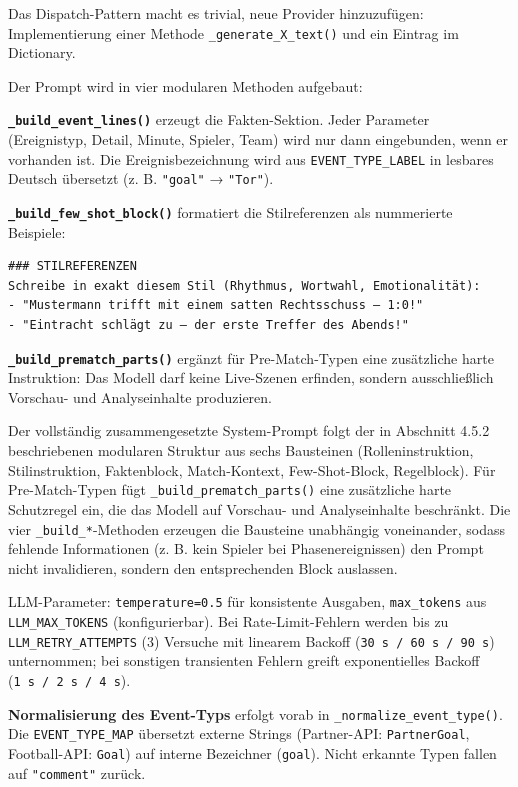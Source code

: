 Das Dispatch-Pattern macht es trivial, neue Provider hinzuzufügen:
Implementierung einer Methode \texttt{\_generate\_X\_text()} und ein
Eintrag im Dictionary.

Der Prompt wird in vier modularen Methoden aufgebaut:

\textbf{\texttt{\_build\_event\_lines()}} erzeugt die Fakten-Sektion.
Jeder Parameter (Ereignistyp, Detail, Minute, Spieler, Team) wird nur
dann eingebunden, wenn er vorhanden ist. Die Ereignisbezeichnung wird
aus \texttt{EVENT\_TYPE\_LABEL} in lesbares Deutsch übersetzt (z. B.
\texttt{"goal"} → \texttt{"Tor"}).

\textbf{\texttt{\_build\_few\_shot\_block()}} formatiert die
Stilreferenzen als nummerierte Beispiele:

\begin{verbatim}
### STILREFERENZEN
Schreibe in exakt diesem Stil (Rhythmus, Wortwahl, Emotionalität):
- "Mustermann trifft mit einem satten Rechtsschuss – 1:0!"
- "Eintracht schlägt zu – der erste Treffer des Abends!"
\end{verbatim}

\textbf{\texttt{\_build\_prematch\_parts()}} ergänzt für Pre-Match-Typen
eine zusätzliche harte Instruktion: Das Modell darf keine Live-Szenen
erfinden, sondern ausschließlich Vorschau- und Analyseinhalte
produzieren.

Der vollständig zusammengesetzte System-Prompt folgt der in Abschnitt
4.5.2 beschriebenen modularen Struktur aus sechs Bausteinen
(Rolleninstruktion, Stilinstruktion, Faktenblock, Match-Kontext,
Few-Shot-Block, Regelblock). Für Pre-Match-Typen fügt
\texttt{\_build\_prematch\_parts()} eine zusätzliche harte Schutzregel
ein, die das Modell auf Vorschau- und Analyseinhalte beschränkt. Die
vier \texttt{\_build\_*}-Methoden erzeugen die Bausteine unabhängig
voneinander, sodass fehlende Informationen (z. B. kein Spieler bei
Phasenereignissen) den Prompt nicht invalidieren, sondern den
entsprechenden Block auslassen.

LLM-Parameter: \texttt{temperature=0.5} für konsistente Ausgaben,
\texttt{max\_tokens} aus \texttt{LLM\_MAX\_TOKENS} (konfigurierbar). Bei
Rate-Limit-Fehlern werden bis zu \texttt{LLM\_RETRY\_ATTEMPTS} (3)
Versuche mit linearem Backoff (\texttt{30\ s\ /\ 60\ s\ /\ 90\ s})
unternommen; bei sonstigen transienten Fehlern greift exponentielles
Backoff (\texttt{1\ s\ /\ 2\ s\ /\ 4\ s}).

\textbf{Normalisierung des Event-Typs} erfolgt vorab in
\texttt{\_normalize\_event\_type()}. Die \texttt{EVENT\_TYPE\_MAP}
übersetzt externe Strings (Partner-API: \texttt{PartnerGoal},
Football-API: \texttt{Goal}) auf interne Bezeichner (\texttt{goal}).
Nicht erkannte Typen fallen auf \texttt{"comment"} zurück.

